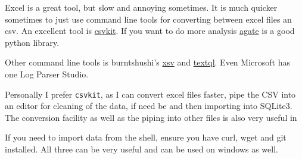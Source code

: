 Excel is a great tool, but slow and annoying sometimes. It is much quicker sometimes to just use command line tools for converting between excel files an csv. An excellent tool is \href{https://csvkit.readthedocs.io/en/1.0.3/index.html}{csvkit}. If you want to do more analysis \href{https://github.com/wireservice/agate}{agate} is a good python library.

Other command line tools is burntshushi's \href{https://github.com/BurntSushi/xsv}{xsv} and \href{https://github.com/dinedal/textql}{textql}. Even Microsoft has one Log Parser Studio.

Personally I prefer \texttt{csvkit}, as I can convert excel files faster, pipe the CSV into an editor for cleaning of the data, if need be and then importing into SQLite3. The conversion facility as well as the piping into other files is also very useful in 

If you need to import data from the shell, ensure you have curl, wget and git installed. All three can be very useful and can be used on windows as well. 